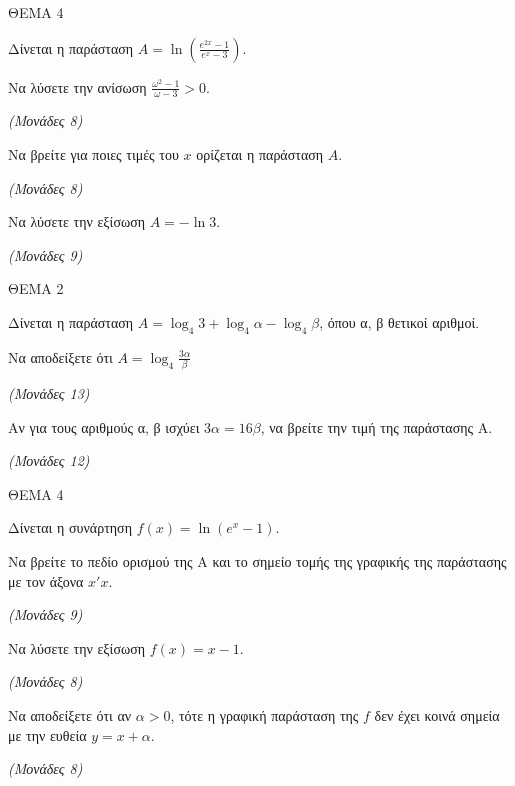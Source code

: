 \documentclass[11pt,a4paper,twoside]{book}
\newcommand{\monades}[1]{\hfill \textit{(Μονάδες #1)}}
\begin{document}
\vspace{4mm}

ΘΕΜΑ 4

Δίνεται η παράσταση $A = \ln\left(\frac{e^{2x} - 1}{e^x - 3}\right)$.

\begin{alist}
\item Να λύσετε την ανίσωση $\frac{\omega^2 - 1}{\omega - 3} > 0$.

\monades{8}

\item Να βρείτε για ποιες τιμές του $x$ ορίζεται η παράσταση $A$.

\monades{8}

\item Να λύσετε την εξίσωση $A = -\ln 3$.

\monades{9}
\end{alist}

\vspace{4mm}

ΘΕΜΑ 2

Δίνεται η παράσταση $A = \log_4 3 + \log_4 \alpha - \log_4 \beta$, όπου α, β θετικοί αριθμοί.

\begin{alist}
\item Να αποδείξετε ότι $A = \log_4 \frac{3\alpha}{\beta}$

\monades{13}

\item Αν για τους αριθμούς α, β ισχύει $3\alpha = 16\beta$, να βρείτε την τιμή της παράστασης Α.

\monades{12}
\end{alist}

\vspace{4mm}

ΘΕΜΑ 4

Δίνεται η συνάρτηση $f(x) = \ln(e^x - 1)$.

\begin{alist}
\item Να βρείτε το πεδίο ορισμού της Α και το σημείο τομής της γραφικής της παράστασης με τον άξονα $x'x$.

\monades{9}

\item Να λύσετε την εξίσωση $f(x) = x - 1$.

\monades{8}

\item Να αποδείξετε ότι αν $\alpha > 0$, τότε η γραφική παράσταση της $f$ δεν έχει κοινά σημεία με την ευθεία $y = x + \alpha$.

\monades{8}
\end{alist}
\end{document}
